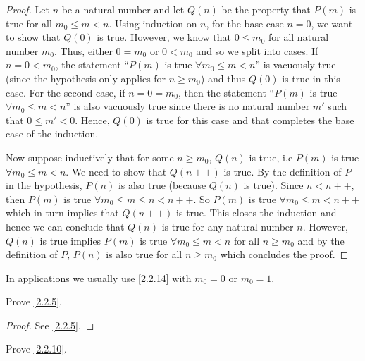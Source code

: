 \begin{proof}
  Let \(n\) be a natural number and let \(Q(n)\) be the property that \(P(m)\) is true for all \(m_0 \leq m < n\).
  Using induction on \(n\), for the base case \(n = 0\), we want to show that \(Q(0)\) is true.
  However, we know that \(0 \leq m_0\) for all natural number \(m_0\).
  Thus, either \(0 = m_0\) or \(0 < m_0\) and so we split into cases.
  If \(n = 0 < m_0\), the statement ``\(P(m)\) is true \(\forall m_0 \leq m < n\)'' is vacuously true (since the hypothesis only applies for \(n \geq m_0\)) and thus \(Q(0)\) is true in this case.
  For the second case, if \(n = 0 = m_0\), then the statement ``\(P(m)\) is true \(\forall m_0 \leq m < n\)'' is also vacuously true since there is no natural number \(m'\) such that \(0 \leq m' < 0\). Hence, \(Q(0)\) is true for this case and that completes the base case of the induction.

  Now suppose inductively that for some \(n \geq m_0\), \(Q(n)\) is true, i.e \(P(m)\) is true \(\forall m_0 \leq m < n\).
  We need to show that \(Q(n++)\) is true.
  By the definition of \(P\) in the hypothesis, \(P(n)\) is also true (because \(Q(n)\) is true).
  Since \(n < n++\), then \(P(m)\) is true \(\forall m_0 \leq m \leq n < n++\).
  So \(P(m)\) is true \(\forall m_0 \leq m < n++\) which in turn implies that \(Q(n++)\) is true.
  This closes the induction and hence we can conclude that \(Q(n)\) is true for any natural number \(n\).
  However, \(Q(n)\) is true implies \(P(m)\) is true \(\forall m_0 \leq m < n\) for all \(n \geq m_0\) and by the definition of \(P\), \(P(n)\) is also true for all \(n \geq m_0\) which concludes the proof.
\end{proof}

\begin{remark}\label{2.2.15}
  In applications we usually use \cref{2.2.14} with \(m_0 = 0\) or \(m_0 = 1\).
\end{remark}

\exercisesection

\begin{exercise}\label{ex 2.2.1}
  Prove \cref{2.2.5}.
\end{exercise}

\begin{proof}
  See \cref{2.2.5}.
\end{proof}

\begin{exercise}\label{ex 2.2.2}
  Prove \cref{2.2.10}.
\end{exercise}

